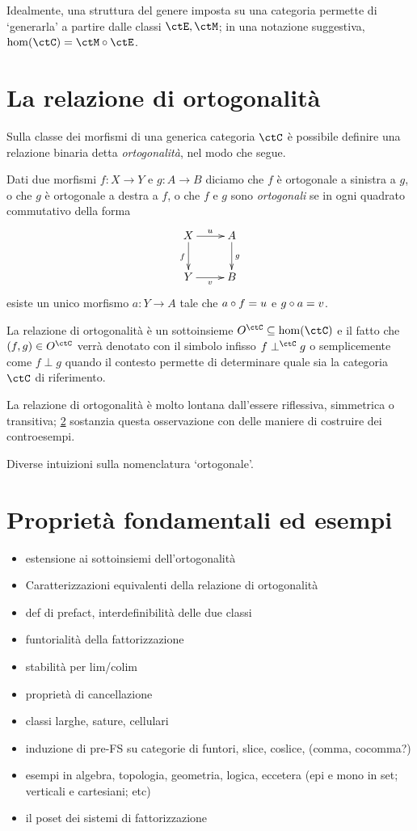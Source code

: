 Idealmente, una struttura del genere imposta su una categoria permette di `generarla' a partire dalle classi \(\ctE,\ctM\); in una notazione suggestiva, \(\hom(\ctC)=\ctM\circ \ctE\).
\section[Ortogonalità]{La relazione di ortogonalità}
Sulla classe dei morfismi di una generica categoria \(\ctC\) è possibile definire una relazione binaria detta \emph{ortogonalità}, nel modo che segue.
\begin{definition}
	Dati due morfismi \(f : X\to Y\) e \(g : A\to B\) diciamo che \(f\) è ortogonale a sinistra a \(g\), o che \(g\) è ortogonale a destra a \(f\), o che \(f\) e \(g\) sono \emph{ortogonali} se in ogni quadrato commutativo della forma
	\[
		\vcenter{\xymatrix{%
				X \ar[r]^u\ar[d]_f & A\ar[d]^g\\
				Y \ar[r]_v & B
			}}\]
	esiste un unico morfismo \(a : Y\to A\) tale che \(a\circ f=u\) e \(g\circ a=v\).
\end{definition}
La relazione di ortogonalità è un sottoinsieme \(O^\ctC \subseteq \hom(\ctC)\) e il fatto che \((f,g)\in O^\ctC\) verrà denotato con il simbolo infisso \(f\perp^\ctC g\) o semplicemente come \(f\perp g\) quando il contesto permette di determinare quale sia la categoria \(\ctC\) di riferimento.

La relazione di ortogonalità è molto lontana dall'essere riflessiva, simmetrica o transitiva; \ref{} sostanzia questa osservazione con delle maniere di costruire dei controesempi.
\begin{remark}\label{perche_ortogonale}
	Diverse intuizioni sulla nomenclatura `ortogonale'.
\end{remark}

\section[Proprietà ed esempi]{Proprietà fondamentali ed esempi}
\begin{itemize}
	\item estensione ai sottoinsiemi dell'ortogonalità
	\item Caratterizzazioni equivalenti della relazione di ortogonalità
	\item def di prefact, interdefinibilità delle due classi
	\item funtorialità della fattorizzazione
	\item stabilità per lim/colim
	\item proprietà di cancellazione
	\item classi larghe, sature, cellulari
	\item induzione di pre-FS su categorie di funtori, slice, coslice, (comma, cocomma?)
	\item esempi in algebra, topologia, geometria, logica, eccetera (epi e mono in set; verticali e cartesiani; etc)
	\item il poset dei sistemi di fattorizzazione
\end{itemize}
